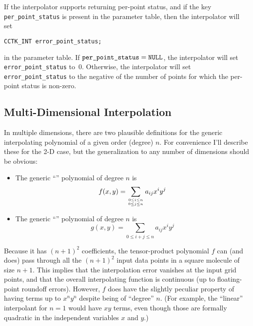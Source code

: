 If the interpolator supports returning per-point status, and if the key
\verb|per_point_status| is present in the parameter table, then the
interpolator will set
\begin{verbatim}
CCTK_INT error_point_status;
\end{verbatim}
in the parameter table.  If $\verb|per_point_status| = \verb|NULL|$,
the interpolator will set \verb|error_point_status| to~0.  Otherwise,
the interpolator will set \verb|error_point_status| to the negative of
the number of points for which the per-point status is non-zero.


\subsection{Multi-Dimensional Interpolation}
\label{AEIThorns/AEILocalInterp/sect-multi-dim-interp}

In multiple dimensions, there are two plausible definitions for the
generic interpolating polynomial of a given order (degree) $n$.  For
convenience I'll describe these for the 2-D case, but the generalization
to any number of dimensions should be obvious:

\begin{itemize}
\item	The generic ``'' polynomial of degree $n$ is
	\begin{equation}
	f(x,y) = \sum_{{0 \le i \le n} \atop {0 \le j \le n}} a_{ij} x^i y^j
			\label{AEIThorns/AEILocalInterp/eqn-polynomial-2d-TP}
	\end{equation}
\item	The generic ``'' polynomial of degree $n$ is
	\begin{equation}
	g(x,y) = \sum_{0 \le i+j \le n} a_{ij} x^i y^j
			\label{AEIThorns/AEILocalInterp/eqn-polynomial-2d-MD}
	\end{equation}
\end{itemize}

Because it has $(n+1)^2$ coefficients, the tensor-product polynomial $f$
can (and does) pass through all the $(n+1)^2$ input data points in a
square molecule of size $n+1$.  This implies that the interpolation
error vanishes at the input grid points, and that the overall
interpolating function is continuous (up to floating-point roundoff
errors).  However, $f$ does have the slightly peculiar property of
having terms up to $x^n y^n$ despite being of ``degree'' $n$.
(For example, the ``linear'' interpolant for $n=1$ would have $xy$ terms,
even though those are formally quadratic in the independent variables
$x$ and $y$.)

